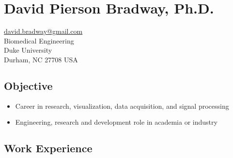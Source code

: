 \documentclass[]{article}
\begin{document}
\section{David Pierson Bradway,
Ph.D.}\label{david-pierson-bradway-ph.d.}

\href{mailto:david.bradway@gmail.com}{david.bradway@gmail.com}\\Biomedical
Engineering\\Duke University\\Durham, NC 27708 USA

\subsection{Objective}\label{objective}

\begin{itemize}
\itemsep1pt\parskip0pt
\item
  Career in research, visualization, data acquisition, and signal
  processing
\item
  Engineering, research and development role in academia or industry
\end{itemize}

\subsection{Work Experience}\label{work-experience}
\end{document}
